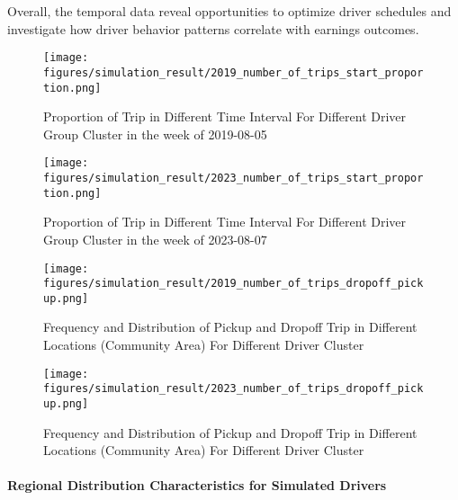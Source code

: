 
\noindent Overall, the temporal data reveal opportunities to optimize driver schedules and investigate how driver behavior patterns correlate with earnings outcomes.

\begin{figure}[ht]
  \centering
  \texttt{[image: figures/simulation\_result/2019\_number\_of\_trips\_start\_proportion.png]}
  \caption{Proportion of Trip in Different Time Interval For Different Driver Group Cluster in the week of 2019-08-05}
  \label{figure:time_chunk_2019}
\end{figure}

\begin{figure}[ht]
  \centering
  \texttt{[image: figures/simulation\_result/2023\_number\_of\_trips\_start\_proportion.png]}
  \caption{Proportion of Trip in Different Time Interval For Different Driver Group Cluster in the week of 2023-08-07}
  \label{figure:time_chunk_2023}
\end{figure}


\begin{figure}[ht]
  \centering
  \texttt{[image: figures/simulation\_result/2019\_number\_of\_trips\_dropoff\_pickup.png]}
\caption{Frequency and Distribution of Pickup and Dropoff Trip in Different Locations (Community Area) For Different Driver Cluster}
  \label{figure:dropoff_pickup_2019}
\end{figure}

\begin{figure}[ht]
  \centering
  \texttt{[image: figures/simulation\_result/2023\_number\_of\_trips\_dropoff\_pickup.png]}
\caption{Frequency and Distribution of Pickup and Dropoff Trip in Different Locations (Community Area) For Different Driver Cluster}
  \label{figure:dropoff_pickup_2023}
\end{figure}
\paragraph{Regional Distribution Characteristics for Simulated Drivers}


